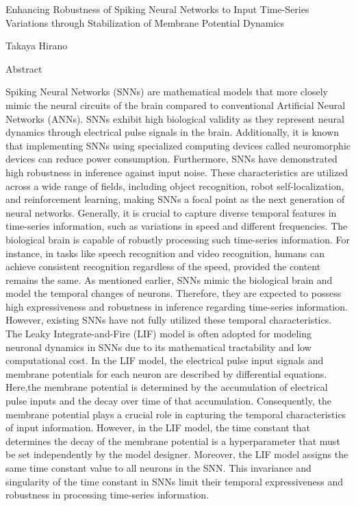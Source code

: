 \pagestyle{empty}

\begin{center}
    Enhancing Robustness of Spiking Neural Networks to Input Time-Series Variations through Stabilization of Membrane Potential Dynamics
\end{center}
\vspace{10mm}
\begin{center}
    Takaya Hirano
\end{center}
\vspace{10mm}

\begin{center}
    Abstract
\end{center}
\vspace{10mm}

Spiking Neural Networks (SNNs) are mathematical models that more closely mimic the neural circuits of the brain compared to conventional Artificial Neural Networks (ANNs).
SNNs exhibit high biological validity as they represent neural dynamics through electrical pulse signals in the brain. Additionally, it is known that implementing SNNs using specialized computing devices called neuromorphic devices can reduce power consumption. 
Furthermore, SNNs have demonstrated high robustness in inference against input noise.
These characteristics are utilized across a wide range of fields, including object recognition, robot self-localization, and reinforcement learning, making SNNs a focal point as the next generation of neural networks.
Generally, it is crucial to capture diverse temporal features in time-series information, such as variations in speed and different frequencies. 
The biological brain is capable of robustly processing such time-series information.
For instance, in tasks like speech recognition and video recognition, humans can achieve consistent recognition regardless of the speed, provided the content remains the same.
As mentioned earlier, SNNs mimic the biological brain and model the temporal changes of neurons.
Therefore, they are expected to possess high expressiveness and robustness in inference regarding time-series information.
However, existing SNNs have not fully utilized these temporal characteristics. The Leaky Integrate-and-Fire (LIF) model is often adopted for modeling neuronal dynamics in SNNs due to its mathematical tractability and low computational cost. 
In the LIF model, the electrical pulse input signals and membrane potentials for each neuron are described by differential equations. 
Here,the membrane potential is determined by the accumulation of electrical pulse inputs and the decay over time of that accumulation. 
Consequently, the membrane potential plays a crucial role in capturing the temporal characteristics of input information. 
However, in the LIF model, the time constant that determines the decay of the membrane potential is a hyperparameter that must be set independently by the model designer. 
Moreover, the LIF model assigns the same time constant value to all neurons in the SNN. 
This invariance and singularity of the time constant in SNNs limit their temporal expressiveness and robustness in processing time-series information.

